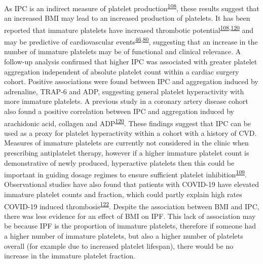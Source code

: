 \documentclass[11pt,twoside]{bristolthesis}
\begin{document}
As IPC is an indirect measure of platelet production\textsuperscript{\protect\hyperlink{ref-Lev2016a}{108}}, these results suggest that an increased BMI may lead to an increased production of platelets. It has been reported that immature platelets have increased thrombotic potential\textsuperscript{\protect\hyperlink{ref-Lev2016a}{108},\protect\hyperlink{ref-Grove2011a}{120}} and may be predictive of cardiovascular events\textsuperscript{\protect\hyperlink{ref-Freynhofer2017a}{46},\protect\hyperlink{ref-Ibrahim2014}{80}}, suggesting that an increase in the number of immature platelets may be of functional and clinical relevance. A follow-up analysis confirmed that higher IPC was associated with greater platelet aggregation independent of absolute platelet count within a cardiac surgery cohort. Positive associations were found between IPC and aggregation induced by adrenaline, TRAP-6 and ADP, suggesting general platelet hyperactivity with more immature platelets. A previous study in a coronary artery disease cohort also found a positive correlation between IPC and aggregation induced by arachidonic acid, collagen and ADP\textsuperscript{\protect\hyperlink{ref-Grove2011a}{120}}. These findings suggest that IPC can be used as a proxy for platelet hyperactivity within a cohort with a history of CVD. Measures of immature platelets are currently not considered in the clinic when prescribing antiplatelet therapy, however if a higher immature platelet count is demonstrative of newly produced, hyperactive platelets then this could be important in guiding dosage regimes to ensure sufficient platelet inhibition\textsuperscript{\protect\hyperlink{ref-Bernlochner2015a}{109}}. Observational studies have also found that patients with COVID-19 have elevated immature platelet counts and fraction, which could partly explain high rates COVID-19 induced thrombosis\textsuperscript{\protect\hyperlink{ref-Klok2020}{122}}. Despite the association between BMI and IPC, there was less evidence for an effect of BMI on IPF. This lack of association may be because IPF is the proportion of immature platelets, therefore if someone had a higher number of immature platelets, but also a higher number of platelets overall (for example due to increased platelet lifespan), there would be no increase in the immature platelet fraction.
\end{document}
